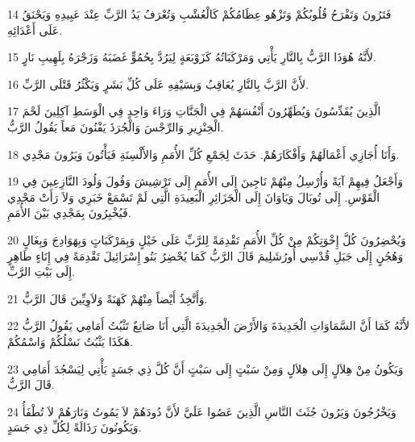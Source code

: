 \par 14 فَتَرُونَ وَتَفْرَحُ قُلُوبُكُمْ وَتَزْهُو عِظَامُكُمْ كَالْعُشْبِ وَتُعْرَفُ يَدُ الرَّبِّ عِنْدَ عَبِيدِهِ وَيَحْنَقُ عَلَى أَعْدَائِهِ.
\par 15 لأَنَّهُ هُوَذَا الرَّبُّ بِالنَّارِ يَأْتِي وَمَرْكَبَاتُهُ كَزَوْبَعَةٍ لِيَرُدَّ بِحُمُوٍّ غَضَبَهُ وَزَجْرَهُ بِلَهِيبِ نَارٍ.
\par 16 لأَنَّ الرَّبَّ بِالنَّارِ يُعَاقِبُ وَبِسَيْفِهِ عَلَى كُلِّ بَشَرٍ وَيَكْثُرُ قَتْلَى الرَّبِّ.
\par 17 الَّذِينَ يُقَدِّسُونَ وَيُطَهِّرُونَ أَنْفُسَهُمْ فِي الْجَنَّاتِ وَرَاءَ وَاحِدٍ فِي الْوَسَطِ آكِلِينَ لَحْمَ الْخِنْزِيرِ وَالرِّجْسَ وَالْجُرَذَ يَفْنُونَ مَعاً يَقُولُ الرَّبُّ.
\par 18 وَأَنَا أُجَازِي أَعْمَالَهُمْ وَأَفْكَارَهُمْ. حَدَثَ لِجَمْعِ كُلِّ الأُمَمِ وَالأَلْسِنَةِ فَيَأْتُونَ وَيَرُونَ مَجْدِي.
\par 19 وَأَجْعَلُ فِيهِمْ آيَةً وَأُرْسِلُ مِنْهُمْ نَاجِينَ إِلَى الأُمَمِ إِلَى تَرْشِيشَ وَفُولَ وَلُودَ النَّازِعِينَ فِي الْقَوْسِ. إِلَى تُوبَالَ وَيَاوَانَ إِلَى الْجَزَائِرِ الْبَعِيدَةِ الَّتِي لَمْ تَسْمَعْ خَبَرِي وَلاَ رَأَتْ مَجْدِي فَيُخْبِرُونَ بِمَجْدِي بَيْنَ الأُمَمِ.
\par 20 وَيُحْضِرُونَ كُلَّ إِخْوَتِكُمْ مِنْ كُلِّ الأُمَمِ تَقْدِمَةً لِلرَّبِّ عَلَى خَيْلٍ وَبِمَرْكَبَاتٍ وَبِهَوَادِجَ وَبِغَالٍ وَهُجُنٍ إِلَى جَبَلِ قُدْسِي أُورُشَلِيمَ قَالَ الرَّبُّ كَمَا يُحْضِرُ بَنُو إِسْرَائِيلَ تَقْدِمَةً فِي إِنَاءٍ طَاهِرٍ إِلَى بَيْتِ الرَّبِّ.
\par 21 وَأَتَّخِذُ أَيْضاً مِنْهُمْ كَهَنَةً وَلاَوِيِّينَ قَالَ الرَّبُّ.
\par 22 لأَنَّهُ كَمَا أَنَّ السَّمَاوَاتِ الْجَدِيدَةَ وَالأَرْضَ الْجَدِيدَةَ الَّتِي أَنَا صَانِعٌ تَثْبُتُ أَمَامِي يَقُولُ الرَّبُّ هَكَذَا يَثْبُتُ نَسْلُكُمْ وَاسْمُكُمْ.
\par 23 وَيَكُونُ مِنْ هِلاَلٍ إِلَى هِلاَلٍ وَمِنْ سَبْتٍ إِلَى سَبْتٍ أَنَّ كُلَّ ذِي جَسَدٍ يَأْتِي لِيَسْجُدَ أَمَامِي قَالَ الرَّبُّ.
\par 24 وَيَخْرُجُونَ وَيَرُونَ جُثَثَ النَّاسِ الَّذِينَ عَصُوا عَلَيَّ لأَنَّ دُودَهُمْ لاَ يَمُوتُ وَنَارَهُمْ لاَ تُطْفَأُ وَيَكُونُونَ رَذَالَةً لِكُلِّ ذِي جَسَدٍ.

